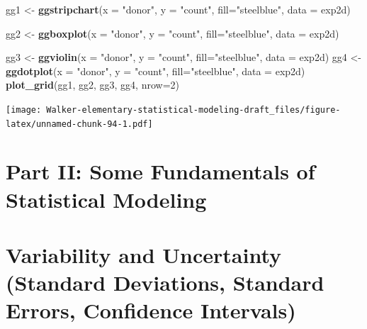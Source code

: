 \documentclass[]{book}
\newenvironment{Shaded}{\begin{snugshade}}{\end{snugshade}}
\newcommand{\DataTypeTok}[1]{\textcolor[rgb]{0.13,0.29,0.53}{#1}}
\newcommand{\DecValTok}[1]{\textcolor[rgb]{0.00,0.00,0.81}{#1}}
\newcommand{\KeywordTok}[1]{\textcolor[rgb]{0.13,0.29,0.53}{\textbf{#1}}}
\newcommand{\NormalTok}[1]{#1}
\newcommand{\StringTok}[1]{\textcolor[rgb]{0.31,0.60,0.02}{#1}}
\begin{document}
\begin{Shaded}
\begin{Highlighting}[]
\NormalTok{gg1 <-}\StringTok{ }\KeywordTok{ggstripchart}\NormalTok{(}\DataTypeTok{x =} \StringTok{"donor"}\NormalTok{,}
          \DataTypeTok{y =} \StringTok{"count"}\NormalTok{,}
          \DataTypeTok{fill=}\StringTok{"steelblue"}\NormalTok{,}
          \DataTypeTok{data =}\NormalTok{ exp2d)}

\NormalTok{gg2 <-}\StringTok{ }\KeywordTok{ggboxplot}\NormalTok{(}\DataTypeTok{x =} \StringTok{"donor"}\NormalTok{,}
          \DataTypeTok{y =} \StringTok{"count"}\NormalTok{,}
          \DataTypeTok{fill=}\StringTok{"steelblue"}\NormalTok{,}
          \DataTypeTok{data =}\NormalTok{ exp2d)}

\NormalTok{gg3 <-}\StringTok{ }\KeywordTok{ggviolin}\NormalTok{(}\DataTypeTok{x =} \StringTok{"donor"}\NormalTok{,}
          \DataTypeTok{y =} \StringTok{"count"}\NormalTok{,}
          \DataTypeTok{fill=}\StringTok{"steelblue"}\NormalTok{,}
          \DataTypeTok{data =}\NormalTok{ exp2d)}
\NormalTok{gg4 <-}\StringTok{ }\KeywordTok{ggdotplot}\NormalTok{(}\DataTypeTok{x =} \StringTok{"donor"}\NormalTok{,}
          \DataTypeTok{y =} \StringTok{"count"}\NormalTok{,}
          \DataTypeTok{fill=}\StringTok{"steelblue"}\NormalTok{,}
          \DataTypeTok{data =}\NormalTok{ exp2d)}
\KeywordTok{plot_grid}\NormalTok{(gg1, gg2, gg3, gg4, }\DataTypeTok{nrow=}\DecValTok{2}\NormalTok{)}
\end{Highlighting}
\end{Shaded}

\texttt{[image: Walker-elementary-statistical-modeling-draft\_files/figure-latex/unnamed-chunk-94-1.pdf]}

\hypertarget{part-ii-some-fundamentals-of-statistical-modeling}{%
\chapter*{Part II: Some Fundamentals of Statistical Modeling}\label{part-ii-some-fundamentals-of-statistical-modeling}}

\hypertarget{variability-and-uncertainty-standard-deviations-standard-errors-confidence-intervals}{%
\chapter{Variability and Uncertainty (Standard Deviations, Standard Errors, Confidence Intervals)}\label{variability-and-uncertainty-standard-deviations-standard-errors-confidence-intervals}}
\end{document}
